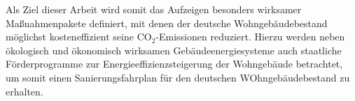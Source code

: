 Als Ziel dieser Arbeit wird somit das Aufzeigen besonders wirksamer Maßnahmenpakete definiert, mit denen der deutsche Wohngebäudebestand möglichst kosteneffizient seine CO\(_2\)-Emissionen reduziert.
Hierzu werden neben ökologisch und ökonomisch wirksamen Gebäudeenergiesysteme auch staatliche Förderprogramme zur Energieeffizienzsteigerung der Wohngebäude betrachtet, um somit einen Sanierungsfahrplan für den deutschen WOhngebäudebestand zu erhalten.